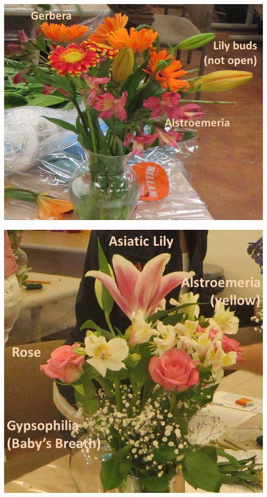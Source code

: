 \documentclass{article}
\begin{document}
\begin{center}
\includegraphics[height=0.9\textheight, angle=90]{../Arrangement1.jpg}
\end{center}
\newpage

\begin{center}
\includegraphics[height=0.9\textheight, angle=90]{../Arrangement2.jpg}
\end{center}
\newpage
\end{document}
